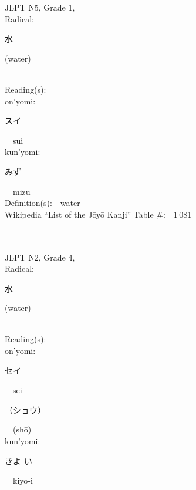 \begin{multicols}{2}
{JLPT N5, Grade 1, \\Radical:\ \ {\begin{CJK}{UTF8}{min} 水 \end{CJK}} (water) } \\
Reading(s):\ \ \\
{\hspace*{1em}}on'yomi:\ \ \\
{\hspace*{2em}}{\begin{CJK}{UTF8}{min} スイ \end{CJK}}\ \ sui\ \ \\
{\hspace*{1em}}kun'yomi:\ \ \\
{\hspace*{2em}}{\begin{CJK}{UTF8}{min} みず \end{CJK}}\ \ mizu\ \ \\
Definition(s):\ \ water \\
Wikipedia ``List of the J\=oy\=o Kanji'' Table \#:\ \ 1\,081 \\
\ \ \\
{\fontsize{34pt}{40pt}  }\ \ \\  %
{JLPT N2, Grade 4, \\Radical:\ \ {\begin{CJK}{UTF8}{min} 水 \end{CJK}} (water) } \\
Reading(s):\ \ \\
{\hspace*{1em}}on'yomi:\ \ \\
{\hspace*{2em}}{\begin{CJK}{UTF8}{min} セイ \end{CJK}}\ \ sei\ \ \\
{\hspace*{2em}}{\begin{CJK}{UTF8}{min} （ショウ） \end{CJK}}\ \ (sh\=o)\ \ \\
{\hspace*{1em}}kun'yomi:\ \ \\
{\hspace*{2em}}{\begin{CJK}{UTF8}{min} きよ-い \end{CJK}}\ \ kiyo-i\ \ \\

\end{multicols}
